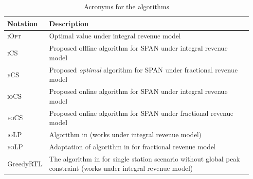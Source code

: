 \documentclass[journal]{IEEEtran}
\newcommand{\ics}{\textsc{iCS}\xspace}
\newcommand{\fcs}{\textsc{fCS}\xspace}
\newcommand{\MCSP}{\textsf{SPAN}\xspace}
\newcommand{\focs}{\textsc{foCS}\xspace}
\newcommand{\iocs}{\textsc{ioCS}\xspace}
\newcommand{\iolp}{\textsc{ioLP}\xspace}
\newcommand{\folp}{\textsc{foLP}\xspace}
\begin{document}
\begin{table}[!t]
\centering
\caption{Acronyms for the algorithms}
\label{tb:comparisons}
\begin{tabular}{ | l| p{6cm}|}
\hline
\textbf{Notation} & \textbf{Description} \\ \hline\hline
\textsc{iOpt} & Optimal value under integral revenue model\\ \hline 	 
\ics & Proposed offline algorithm for \MCSP under integral revenue model\\ \hline
\fcs & Proposed \emph{optimal} algorithm for \MCSP under fractional revenue model\\\hline 
\iocs & Proposed online algorithm for \MCSP under integral revenue model\\ \hline
\focs & Proposed online algorithm for \MCSP under fractional revenue model\\ \hline
\iolp & Algorithm in \cite{lee2016adaptive} (works under integral revenue model)\\ \hline
\folp & Adaptation of algorithm in \cite{lee2016adaptive} for fractional revenue model\\ \hline
GreedyRTL & The algorithm in \cite{Jain} for single station scenario without global peak 			constraint (works under integral revenue model)\\\hline				
\end{tabular}
\end{table}
\end{document}
